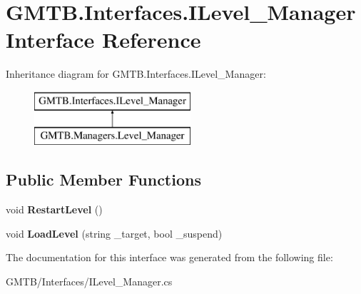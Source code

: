 \hypertarget{interface_g_m_t_b_1_1_interfaces_1_1_i_level___manager}{}\section{G\+M\+T\+B.\+Interfaces.\+I\+Level\+\_\+\+Manager Interface Reference}
\label{interface_g_m_t_b_1_1_interfaces_1_1_i_level___manager}
Inheritance diagram for G\+M\+T\+B.\+Interfaces.\+I\+Level\+\_\+\+Manager\+:\begin{figure}[H]
\begin{center}
\leavevmode
\includegraphics[height=2.000000cm]{interface_g_m_t_b_1_1_interfaces_1_1_i_level___manager}
\end{center}
\end{figure}
\subsection*{Public Member Functions}
\begin{DoxyCompactItemize}
\item 
\mbox{\label{interface_g_m_t_b_1_1_interfaces_1_1_i_level___manager_a1e2452d75109c847a89d077c0b132a47}} 
void {\bfseries Restart\+Level} ()
\item 
\mbox{\label{interface_g_m_t_b_1_1_interfaces_1_1_i_level___manager_acf31cd8cd19c557f3aefc6194c9b6d43}} 
void {\bfseries Load\+Level} (string \+\_\+target, bool \+\_\+suspend)
\end{DoxyCompactItemize}


The documentation for this interface was generated from the following file\+:\begin{DoxyCompactItemize}
\item 
G\+M\+T\+B/\+Interfaces/I\+Level\+\_\+\+Manager.\+cs\end{DoxyCompactItemize}
